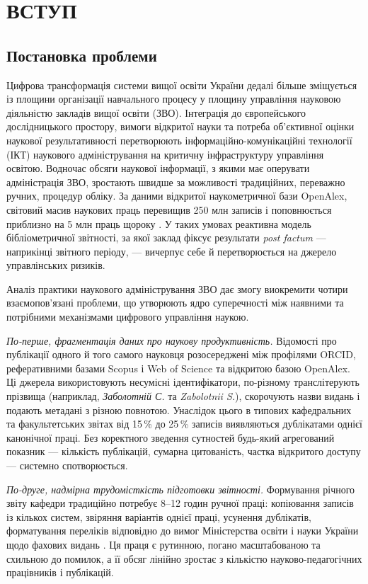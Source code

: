 \section*{ВСТУП}

\subsection*{Постановка проблеми}

Цифрова трансформація системи вищої освіти України дедалі більше зміщується із площини організації навчального процесу у площину управління науковою діяльністю закладів вищої освіти (ЗВО). Інтеграція до європейського дослідницького простору, вимоги відкритої науки та потреба об'єктивної оцінки наукової результативності перетворюють інформаційно-комунікаційні технології (ІКТ) наукового адміністрування на критичну інфраструктуру управління освітою. Водночас обсяги наукової інформації, з якими має оперувати адміністрація ЗВО, зростають швидше за можливості традиційних, переважно ручних, процедур обліку. За даними відкритої наукометричної бази OpenAlex, світовий масив наукових праць перевищив 250 млн записів і поповнюється приблизно на 5 млн праць щороку \cite{OpenAlex2024Docs}. У таких умовах реактивна модель бібліометричної звітності, за якої заклад фіксує результати \textit{post factum} --- наприкінці звітного періоду, --- вичерпує себе й перетворюється на джерело управлінських ризиків.

Аналіз практики наукового адміністрування ЗВО дає змогу виокремити чотири взаємопов'язані проблеми, що утворюють ядро суперечності між наявними та потрібними механізмами цифрового управління наукою.

\textit{По-перше, фрагментація даних про наукову продуктивність.} Відомості про публікації одного й того самого науковця розосереджені між профілями ORCID, реферативними базами Scopus і Web of Science та відкритою базою OpenAlex. Ці джерела використовують несумісні ідентифікатори, по-різному транслітерують прізвища (наприклад, \textit{Заболотній С.} та \textit{Zabolotnii S.}), скорочують назви видань і подають метадані з різною повнотою. Унаслідок цього в типових кафедральних та факультетських звітах від 15\,\% до 25\,\% записів виявляються дублікатами однієї канонічної праці. Без коректного зведення сутностей будь-який агрегований показник --- кількість публікацій, сумарна цитованість, частка відкритого доступу --- системно спотворюється.

\textit{По-друге, надмірна трудомісткість підготовки звітності.} Формування річного звіту кафедри традиційно потребує 8--12 годин ручної праці: копіювання записів із кількох систем, звіряння варіантів однієї праці, усунення дублікатів, форматування переліків відповідно до вимог Міністерства освіти і науки України щодо фахових видань \cite{MONUkraine2023ProfessionalJournalsOrder}. Ця праця є рутинною, погано масштабованою та схильною до помилок, а її обсяг лінійно зростає з кількістю науково-педагогічних працівників і публікацій.

